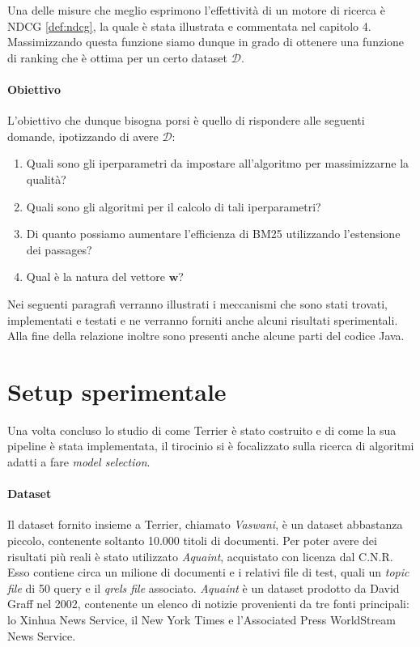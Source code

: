 Una delle misure che meglio esprimono l'effettività di un motore di ricerca è NDCG \ref{def:ndcg}, la quale è
stata illustrata e commentata nel capitolo 4.
Massimizzando questa funzione siamo dunque in grado di ottenere una funzione di ranking che
è ottima per un certo dataset $\mathcal{D}$.

\paragraph{Obiettivo}
L'obiettivo che dunque bisogna porsi è quello di rispondere alle seguenti domande, ipotizzando
di avere $\mathcal{D}$:

\begin{enumerate}
	\item Quali sono gli iperparametri da impostare all'algoritmo per massimizzarne la qualità?
	\item Quali sono gli algoritmi per il calcolo di tali iperparametri?
	\item Di quanto possiamo aumentare l'efficienza di BM25 utilizzando l'estensione dei passages?
	\item Qual è la natura del vettore $\boldsymbol{w}$?
\end{enumerate}

Nei seguenti paragrafi verranno illustrati i meccanismi che sono stati
trovati, implementati e testati e ne verranno forniti anche alcuni risultati
sperimentali. Alla fine della relazione inoltre sono presenti anche alcune
parti del codice Java.

\section{Setup sperimentale}

Una volta concluso lo studio di come Terrier è stato costruito e di come la sua pipeline è stata implementata,
il tirocinio si è focalizzato sulla ricerca di algoritmi adatti a fare \textit{model selection}.

\paragraph{Dataset}
Il dataset fornito insieme a Terrier, chiamato \textit{Vaswani}, è un dataset abbastanza piccolo,
contenente soltanto 10.000 titoli di documenti. Per poter avere dei risultati più
reali è stato utilizzato \textit{Aquaint}, acquistato con licenza dal C.N.R.
Esso contiene circa un milione di documenti e i relativi file di test, quali
un \textit{topic file} di 50 query e il \textit{qrels file} associato.
\textit{Aquaint} è un dataset prodotto da David Graff nel 2002,
contenente un elenco di notizie provenienti da tre fonti principali:
lo Xinhua News Service, il New York Times e l'Associated Press WorldStream News Service.



